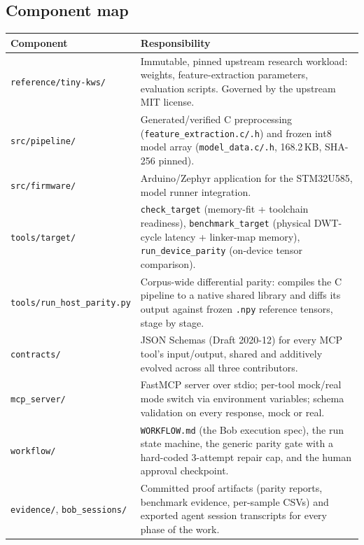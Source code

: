 \documentclass[11pt,a4paper]{article}
\begin{document}
\subsection{Component map}

\begin{longtable}{@{}p{4.3cm}p{10.1cm}@{}}
\toprule
\textbf{Component} & \textbf{Responsibility} \\
\midrule
\endhead
\texttt{reference/tiny-kws/} & Immutable, pinned upstream research workload: weights, feature-extraction parameters, evaluation scripts. Governed by the upstream MIT license. \\
\addlinespace
\texttt{src/pipeline/} & Generated/verified C preprocessing (\texttt{feature\_extraction.c/.h}) and frozen int8 model array (\texttt{model\_data.c/.h}, 168.2\,KB, SHA-256 pinned). \\
\addlinespace
\texttt{src/firmware/} & Arduino/Zephyr application for the STM32U585, model runner integration. \\
\addlinespace
\texttt{tools/target/} & \texttt{check\_target} (memory-fit + toolchain readiness), \texttt{benchmark\_target} (physical DWT-cycle latency + linker-map memory), \texttt{run\_device\_parity} (on-device tensor comparison). \\
\addlinespace
\texttt{tools/run\_host\_parity.py} & Corpus-wide differential parity: compiles the C pipeline to a native shared library and diffs its output against frozen \texttt{.npy} reference tensors, stage by stage. \\
\addlinespace
\texttt{contracts/} & JSON Schemas (Draft 2020-12) for every MCP tool's input/output, shared and additively evolved across all three contributors. \\
\addlinespace
\texttt{mcp\_server/} & FastMCP server over stdio; per-tool mock/real mode switch via environment variables; schema validation on every response, mock or real. \\
\addlinespace
\texttt{workflow/} & \texttt{WORKFLOW.md} (the Bob execution spec), the run state machine, the generic parity gate with a hard-coded 3-attempt repair cap, and the human approval checkpoint. \\
\addlinespace
\texttt{evidence/}, \texttt{bob\_sessions/} & Committed proof artifacts (parity reports, benchmark evidence, per-sample CSVs) and exported agent session transcripts for every phase of the work. \\
\bottomrule
\end{longtable}
\end{document}
